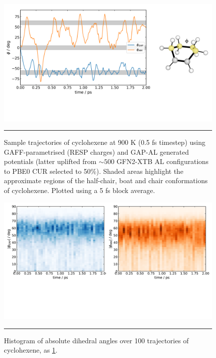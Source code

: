 \documentclass[11pt]{article}
\numberwithin{equation}{subsection}
\begin{document}
\begin{figure}[h!]
	\centering
	\vspace{0.4cm}
	\includegraphics[width=14cm]{figSX13.pdf}
	\vspace{0.1cm}
	\hrule
	\vspace{0.1cm}
	\caption{Sample trajectories of cyclohexene at 900 K (0.5 fs timestep) using GAFF-parametrised (RESP charges) and GAP-AL generated potentials (latter uplifted from $\sim500$ GFN2-XTB AL configurations to PBE0 CUR selected to 50\%). Shaded areas highlight the approximate regions of the half-chair, boat and chair conformations of cyclohexene. Plotted using a 5 fs block average.}
	\label{fig::SX13}
\end{figure}


\begin{figure}[h!]
	\centering
	\vspace{0.4cm}
	\includegraphics[width=\textwidth]{figSX14.pdf}
	\vspace{0.1cm}
	\hrule
	\vspace{0.1cm}
	\caption{Histogram of absolute dihedral angles over 100 trajectories of cyclohexene, as \figurename{ \ref{fig::SX13}}.}
	\label{fig::SX14}
\end{figure}
\end{document}
